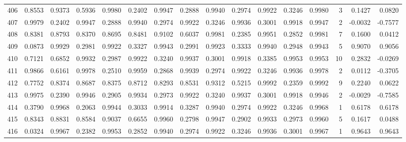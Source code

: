 \begin{tabular}{lrrrrrrrrrrrrrrr}
406 &      0.8553 &  0.9373 &  0.5936 &  0.9980 &  0.2402 &  0.9947 &  0.2888 &  0.9940 &  0.2974 &  0.9922 &   0.3246 &     0.9980 &      3 &                    0.1427 &                     0.0820 \\
407 &      0.9979 &  0.2402 &  0.9947 &  0.2888 &  0.9940 &  0.2974 &  0.9922 &  0.3246 &  0.9936 &  0.3001 &   0.9918 &     0.9947 &      2 &                   -0.0032 &                    -0.7577 \\
408 &      0.8381 &  0.8793 &  0.8370 &  0.8695 &  0.8481 &  0.9102 &  0.6037 &  0.9981 &  0.2385 &  0.9951 &   0.2852 &     0.9981 &      7 &                    0.1600 &                     0.0412 \\
409 &      0.0873 &  0.9929 &  0.2981 &  0.9922 &  0.3327 &  0.9943 &  0.2991 &  0.9923 &  0.3333 &  0.9940 &   0.2948 &     0.9943 &      5 &                    0.9070 &                     0.9056 \\
410 &      0.7121 &  0.6852 &  0.9932 &  0.2987 &  0.9922 &  0.3240 &  0.9937 &  0.3001 &  0.9918 &  0.3385 &   0.9953 &     0.9953 &     10 &                    0.2832 &                    -0.0269 \\
411 &      0.9866 &  0.6161 &  0.9978 &  0.2510 &  0.9959 &  0.2868 &  0.9939 &  0.2974 &  0.9922 &  0.3246 &   0.9936 &     0.9978 &      2 &                    0.0112 &                    -0.3705 \\
412 &      0.7752 &  0.8374 &  0.8687 &  0.8375 &  0.8712 &  0.8293 &  0.8531 &  0.9312 &  0.5215 &  0.9992 &   0.2359 &     0.9992 &      9 &                    0.2240 &                     0.0622 \\
413 &      0.9975 &  0.2390 &  0.9946 &  0.2905 &  0.9934 &  0.2973 &  0.9922 &  0.3240 &  0.9937 &  0.3001 &   0.9918 &     0.9946 &      2 &                   -0.0029 &                    -0.7585 \\
414 &      0.3790 &  0.9968 &  0.2063 &  0.9944 &  0.3033 &  0.9914 &  0.3287 &  0.9940 &  0.2974 &  0.9922 &   0.3246 &     0.9968 &      1 &                    0.6178 &                     0.6178 \\
415 &      0.8343 &  0.8831 &  0.8584 &  0.9037 &  0.6655 &  0.9960 &  0.2798 &  0.9947 &  0.2902 &  0.9933 &   0.2973 &     0.9960 &      5 &                    0.1617 &                     0.0488 \\
416 &      0.0324 &  0.9967 &  0.2382 &  0.9953 &  0.2852 &  0.9940 &  0.2974 &  0.9922 &  0.3246 &  0.9936 &   0.3001 &     0.9967 &      1 &                    0.9643 &                     0.9643 \\

\end{tabular}
